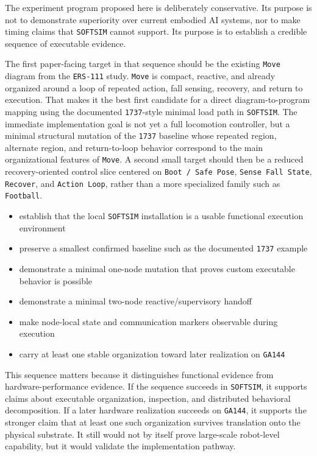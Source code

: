 \documentclass[11pt]{article}
\begin{document}
The experiment program proposed here is deliberately conservative. Its
purpose is not to demonstrate superiority over current embodied AI
systems, nor to make timing claims that \texttt{SOFTSIM} cannot
support. Its purpose is to establish a credible sequence of executable
evidence.

The first paper-facing target in that sequence should be the existing
\texttt{Move} diagram from the \texttt{ERS-111} study. \texttt{Move}
is compact, reactive, and already organized around a loop of repeated
action, fall sensing, recovery, and return to execution. That makes it
the best first candidate for a direct diagram-to-program mapping using
the documented \texttt{1737}-style minimal load path in
\texttt{SOFTSIM}. The immediate implementation goal is not yet a full
locomotion controller, but a minimal structural mutation of the
\texttt{1737} baseline whose repeated region, alternate region, and
return-to-loop behavior correspond to the main organizational features
of \texttt{Move}. A second small target should then be a reduced
recovery-oriented control slice centered on \texttt{Boot / Safe Pose},
\texttt{Sense Fall State}, \texttt{Recover}, and \texttt{Action Loop},
rather than a more specialized family such as \texttt{Football}.

\begin{itemize}
\item establish that the local \texttt{SOFTSIM} installation is a usable functional execution environment
\item preserve a smallest confirmed baseline such as the documented \texttt{1737} example
\item demonstrate a minimal one-node mutation that proves custom executable behavior is possible
\item demonstrate a minimal two-node reactive/supervisory handoff
\item make node-local state and communication markers observable during execution
\item carry at least one stable organization toward later realization on \texttt{GA144}
\end{itemize}

This sequence matters because it distinguishes functional evidence from
hardware-performance evidence. If the sequence succeeds in
\texttt{SOFTSIM}, it supports claims about executable organization,
inspection, and distributed behavioral decomposition. If a later
hardware realization succeeds on \texttt{GA144}, it supports the
stronger claim that at least one such organization survives translation
onto the physical substrate. It still would not by itself prove
large-scale robot-level capability, but it would validate the
implementation pathway.
\end{document}
